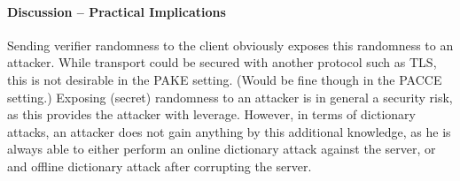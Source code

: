 %
%
%
%
%
%


\paragraph{Discussion -- Practical Implications}
Sending verifier randomness to the client obviously exposes this randomness to an attacker.
While transport could be secured with another protocol such as \ac{TLS}, this is not desirable in the \ac{PAKE} setting.
(Would be fine though in the \ac{PACCE} setting.)
Exposing (secret) randomness to an attacker is in general a security risk, as this provides the attacker with leverage.
However, in terms of dictionary attacks, an attacker does not gain anything by this additional knowledge, as he is always able to either perform an online dictionary attack against the server, or and offline dictionary attack after corrupting the server.

